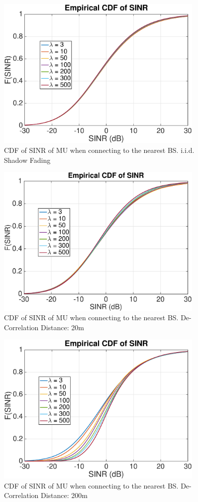 \begin{figure}
\centering
\includegraphics[width=10cm]{NBMax1000OutageProbCDFiid.eps}
\caption{CDF of SINR of MU when connecting to the nearest BS. i.i.d. Shadow Fading}
\label{Mode1}
\end{figure}
\begin{figure}
\centering
\includegraphics[width=10cm]{NBMax1000OutageProbCDFDeCorr20.eps}
\caption{CDF of SINR of MU when connecting to the nearest BS. De-Correlation Distance: 20m}
\label{Mode2}
\end{figure}
\begin{figure}
\centering
\includegraphics[width=10cm]{NBMax1000OutageProbCDFDeCorr200.eps}
\caption{CDF of SINR of MU when connecting to the nearest BS. De-Correlation Distance: 200m}
\label{Mode3}
\end{figure}


